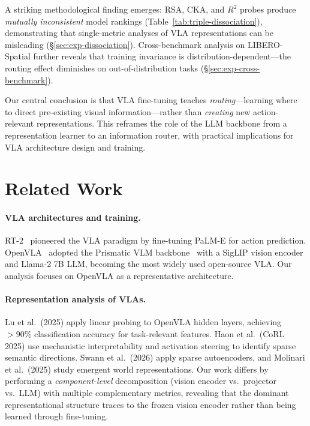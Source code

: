 \documentclass[letterpaper]{article}
\begin{document}
A striking methodological finding emerges: RSA, CKA, and $R^2$ probes produce \emph{mutually inconsistent} model rankings (Table~\ref{tab:triple-dissociation}), demonstrating that single-metric analyses of VLA representations can be misleading (\S\ref{sec:exp-dissociation}). Cross-benchmark analysis on LIBERO-Spatial further reveals that training invariance is distribution-dependent---the routing effect diminishes on out-of-distribution tasks (\S\ref{sec:exp-cross-benchmark}).

Our central conclusion is that VLA fine-tuning teaches \emph{routing}---learning where to direct pre-existing visual information---rather than \emph{creating} new action-relevant representations. This reframes the role of the LLM backbone from a representation learner to an information router, with practical implications for VLA architecture design and training.

\section{Related Work}
\label{sec:related}

\paragraph{VLA architectures and training.}
RT-2~\cite{brohan2023rt2} pioneered the VLA paradigm by fine-tuning PaLM-E for action prediction. OpenVLA~\cite{kim2024openvla} adopted the Prismatic VLM backbone~\cite{karamcheti2024prismatic} with a SigLIP vision encoder and Llama-2 7B LLM, becoming the most widely used open-source VLA. Our analysis focuses on OpenVLA as a representative architecture.

\paragraph{Representation analysis of VLAs.}
Lu et al.~(2025) apply linear probing to OpenVLA hidden layers, achieving $>90\%$ classification accuracy for task-relevant features. Haon et al.~(CoRL 2025) use mechanistic interpretability and activation steering to identify sparse semantic directions. Swann et al.~(2026) apply sparse autoencoders, and Molinari et al.~(2025) study emergent world representations. Our work differs by performing a \emph{component-level} decomposition (vision encoder vs.\ projector vs.\ LLM) with multiple complementary metrics, revealing that the dominant representational structure traces to the frozen vision encoder rather than being learned through fine-tuning.
\end{document}
